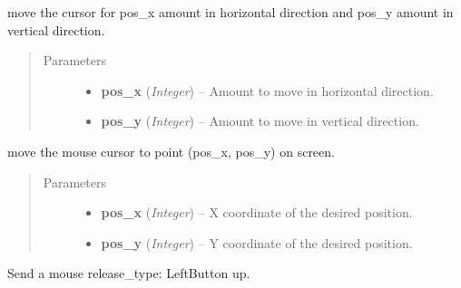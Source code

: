 \documentclass[letterpaper,10pt,english]{sphinxmanual}
\begin{document}

\begin{fulllineitems}
\label{macro:macro.move}
move the cursor for pos\_x amount in horizontal direction and pos\_y amount
in vertical direction.
\begin{quote}\begin{description}
\item[{Parameters}] \leavevmode\begin{itemize}
\item {} 
\textbf{pos\_x} (\emph{Integer}) -- Amount to move in horizontal direction.

\item {} 
\textbf{pos\_y} (\emph{Integer}) -- Amount to move in vertical direction.

\end{itemize}

\end{description}\end{quote}

\end{fulllineitems}


\begin{fulllineitems}
\label{macro:macro.move_to}
move the mouse cursor to point (pos\_x, pos\_y) on screen.
\begin{quote}\begin{description}
\item[{Parameters}] \leavevmode\begin{itemize}
\item {} 
\textbf{pos\_x} (\emph{Integer}) -- X coordinate of the desired position.

\item {} 
\textbf{pos\_y} (\emph{Integer}) -- Y coordinate of the desired position.

\end{itemize}

\end{description}\end{quote}

\end{fulllineitems}


\begin{fulllineitems}
\label{macro:macro.release}
Send a mouse release\_type: LeftButton up.

\end{fulllineitems}
\end{document}
